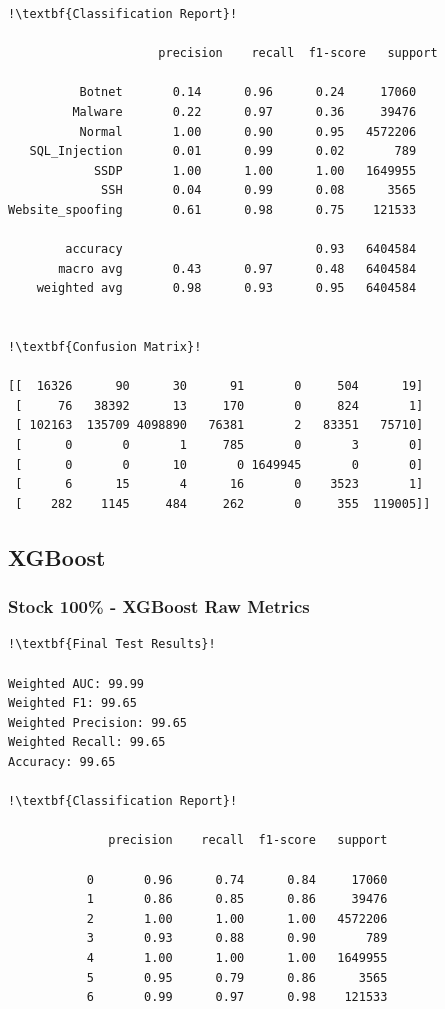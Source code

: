 \begin{appendices}
\begin{lstlisting}[escapechar=!]
!\textbf{Classification Report}!

                     precision    recall  f1-score   support

          Botnet       0.14      0.96      0.24     17060
         Malware       0.22      0.97      0.36     39476
          Normal       1.00      0.90      0.95   4572206
   SQL_Injection       0.01      0.99      0.02       789
            SSDP       1.00      1.00      1.00   1649955
             SSH       0.04      0.99      0.08      3565
Website_spoofing       0.61      0.98      0.75    121533
           
        accuracy                           0.93   6404584
       macro avg       0.43      0.97      0.48   6404584
    weighted avg       0.98      0.93      0.95   6404584
    
    
!\textbf{Confusion Matrix}!

[[  16326      90      30      91       0     504      19]
 [     76   38392      13     170       0     824       1]
 [ 102163  135709 4098890   76381       2   83351   75710]
 [      0       0       1     785       0       3       0]
 [      0       0      10       0 1649945       0       0]
 [      6      15       4      16       0    3523       1]
 [    282    1145     484     262       0     355  119005]]
\end{lstlisting}

\newpage
\subsection{XGBoost}

\subsubsection{Stock 100\% - XGBoost Raw Metrics}
\begin{lstlisting}[escapechar=!]
!\textbf{Final Test Results}!

Weighted AUC: 99.99
Weighted F1: 99.65
Weighted Precision: 99.65
Weighted Recall: 99.65
Accuracy: 99.65

!\textbf{Classification Report}!

              precision    recall  f1-score   support

           0       0.96      0.74      0.84     17060
           1       0.86      0.85      0.86     39476
           2       1.00      1.00      1.00   4572206
           3       0.93      0.88      0.90       789
           4       1.00      1.00      1.00   1649955
           5       0.95      0.79      0.86      3565
           6       0.99      0.97      0.98    121533


\end{lstlisting}
\end{appendices}
